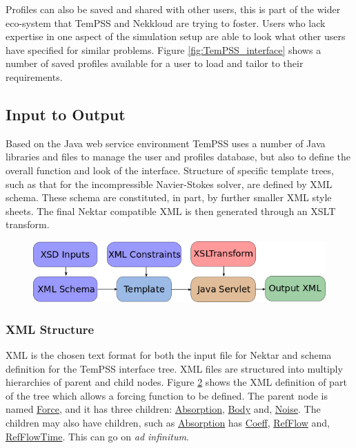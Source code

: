\documentclass[11pt, a4paper]{report}
\begin{document}
Profiles can also be saved and shared with other users, this is part of the wider eco-system that TemPSS and Nekkloud are trying to foster. Users who lack expertise in one aspect of the simulation setup are able to look what other users have specified for similar problems. Figure \ref{fig:TemPSS_interface} shows a number of saved profiles available for a user to load and tailor to their requirements.

\subsection{Input to Output}
Based on the Java web service environment TemPSS uses a number of Java libraries and files to manage the user and profiles database, but also to define the overall function and look of the interface. Structure of specific template trees, such as that for the incompressible Navier-Stokes solver, are defined by XML schema. These schema are constituted, in part, by further smaller XML style sheets. The final Nektar compatible XML is then generated through an XSLT transform.

\begin{figure}[htb!]
 \centering
 \includegraphics[width=.75\linewidth,  clip=true, trim = 0cm 0cm 0cm 0cm]{TEMPSS}
 \label{fig:TEMPSS}
\end{figure}

\subsubsection{XML Structure}
XML is the chosen text format for both the input file for Nektar and schema definition for the TemPSS interface tree. XML files are structured into multiply hierarchies of parent and child nodes. Figure \ref{fig:XML} shows the XML definition of part of the tree which allows a forcing function to be defined. The parent node is named \url{Force}, and it has three children: \url{Absorption}, \url{Body} and, \url{Noise}. The children may also have children, such as \url{Absorption} has \url{Coeff}, \url{RefFlow} and, \url{RefFlowTime}. This can go on \textit{ad infinitum}.

\begin{figure}[htb!]
 \centering
 
 \label{fig:XML}
\end{figure}
\end{document}
